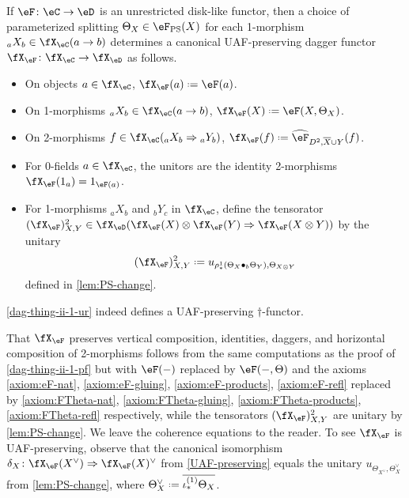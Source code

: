 \documentclass[12pt,reqno]{amsart}
\newcommand{\C}{\eC}
\newcommand{\D}{\eD}
\newcommand{\blt}{\bullet}
\newcommand{\fcj}[1]{\overline{#1}}
\DeclareRobustCommand{\coloneq}{\mathrel{\vcenter{\baselineskip0.5ex\lineskiplimit0pt\hbox{\scriptsize{\upshape.}}\hbox{\scriptsize{\upshape.}}}}=}
\begin{document}
\begin{construction}[Functors from unrestricted disk-like functors, \texorpdfstring{$n=2$}{n is 2}]
\label{dag-thing-ii-1-ur}
If $\eF\colon\C\to\D$ is an unrestricted disk-like functor, then a choice of parameterized splitting $\Theta_X\in\eF_{\mathrm{PS}}(X)$ for each 1-morphism ${}_aX_b\in\fX_\C(a\to b)$ determines a canonical UAF-preserving dagger functor $\fX_\eF\colon\fX_\C\to\fX_\D$ as follows. 

\begin{itemize}
    \item On objects $a\in\fX_\C$, $\fX_\eF(a)\coloneq\eF(a)$.
    \item On 1-morphisms ${}_aX_b\in\fX_\C(a\to b)$, $\fX_\eF(X)\coloneq\eF(X,\Theta_X)$.
    \item On 2-morphisms $f\in\fX_\C({}_aX_b\Rightarrow{}_aY_b)$, $\fX_\eF(f)\coloneq\widehat\eF_{D^2,\fcj{X}\cup Y}(f)$.
    \item For 0-fields $a\in\fX_\C$, the unitors are the identity 2-morphisms $\fX_\eF(1_a)=1_{\eF(a)}$.
    \item For 1-morphisms ${}_aX_b$ and ${}_bY_c$ in $\fX_\C$, define the tensorator $(\fX_\eF)^2_{X,Y}\in\fX_\D(\fX_\eF(X)\otimes \fX_\eF(Y)\Rightarrow\fX_\eF(X\otimes Y))$ by the unitary
    \[
    (\fX_\eF)^2_{X,Y}\coloneq u_{\rho^1_*(\Theta_X\blt_b\Theta_Y),\Theta_{X\otimes Y}}
    \]
    defined in \cref{lem:PS-change}.
\end{itemize}
\end{construction} 

\begin{lemma}
\label{dag-thing-ii-1-ur-pf}
\cref{dag-thing-ii-1-ur} indeed defines a UAF-preserving $\dag$-functor.
\end{lemma}

\begin{pf}
That $\fX_\eF$ preserves vertical composition, identities, daggers, and horizontal composition of 2-morphisms follows from the same computations as the proof of \cref{dag-thing-ii-1-pf} but with $\eF(-)$ replaced by $\eF(-,\Theta)$ and the axioms \ref{axiom:eF-nat}, \ref{axiom:eF-gluing}, \ref{axiom:eF-products}, \ref{axiom:eF-refl} replaced by \ref{axiom:FTheta-nat}, \ref{axiom:FTheta-gluing}, \ref{axiom:FTheta-products}, \ref{axiom:FTheta-refl} respectively, while the tensorators $(\fX_\eF)^2_{X,Y}$ are unitary by \cref{lem:PS-change}. We leave the coherence equations to the reader.
To see $\fX_\eF$ is UAF-preserving, observe that the canonical isomorphism $\delta_X\colon\fX_\eF(X^\vee)\Rightarrow \fX_\eF(X)^\vee$ from \cref{UAF-preserving} equals the unitary $u_{\Theta_{X^\vee},\Theta_X^\vee}$ from \cref{lem:PS-change}, where $\Theta_X^\vee\coloneq\fcj{\iota^{(1)}_*\Theta_X}$. 
\end{pf}
\end{document}
